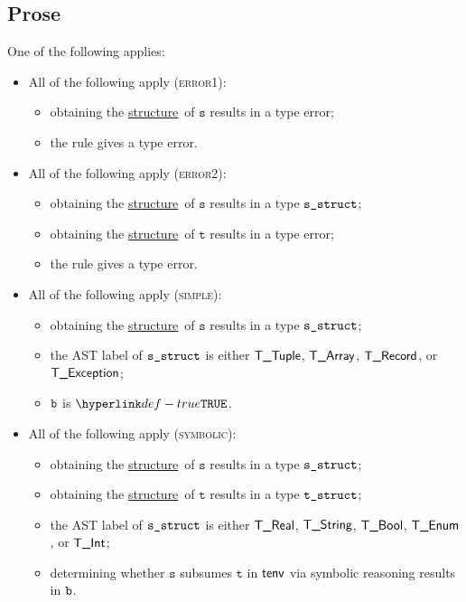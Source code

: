 \documentclass{book}
\newcommand\structure[0]{\hyperlink{def-structure}{structure}}
\newcommand\vt[0]{\texttt{t}}
\newcommand\vs[0]{\texttt{s}}
\begin{document}
\subsection{Prose}
One of the following applies:
\begin{itemize}
  \item All of the following apply (\textsc{error1}):
  \begin{itemize}
    \item obtaining the \structure\ of $\vs$ results in a type error;
    \item the rule gives a type error.
  \end{itemize}

  \item All of the following apply (\textsc{error2}):
  \begin{itemize}
    \item obtaining the \structure\ of $\vs$ results in a type $\texttt{s\_struct}$;
    \item obtaining the \structure\ of $\vt$ results in a type error;
    \item the rule gives a type error.
  \end{itemize}

  \item All of the following apply (\textsc{simple}):
  \begin{itemize}
    \item obtaining the \structure\ of $\vs$ results in a type $\texttt{s\_struct}$;
    \item the AST label of $\texttt{s\_struct}$ is either $\textsf{T\_Tuple}$, $\textsf{T\_Array}$, $\textsf{T\_Record}$, or $\textsf{T\_Exception}$;
    \item $\texttt{b}$ is $\True$.
  \end{itemize}

  \item All of the following apply (\textsc{symbolic}):
  \begin{itemize}
    \item obtaining the \structure\ of $\vs$ results in a type $\texttt{s\_struct}$;
    \item obtaining the \structure\ of $\vt$ results in a type $\texttt{t\_struct}$;
    \item the AST label of $\texttt{s\_struct}$ is either $\textsf{T\_Real}$, $\textsf{T\_String}$, $\textsf{T\_Bool}$, $\textsf{T\_Enum}$, or $\textsf{T\_Int}$;
    \item determining whether $\vs$ subsumes $\vt$ in $\textsf{tenv}$ via symbolic reasoning results in $\texttt{b}$.
  \end{itemize}
\end{itemize}
\end{document}
